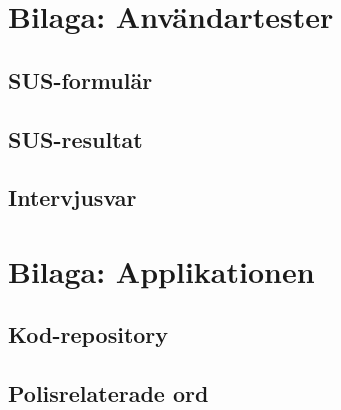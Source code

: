 \documentclass[swedish]{maucsthesis}
\begin{document}
\appendix

\section{Bilaga: Användartester}

\subsection{SUS-formulär}

\subsection{SUS-resultat}

\subsection{Intervjusvar}

\section{Bilaga: Applikationen}

\subsection{Kod-repository}

\subsection{Polisrelaterade ord}
\end{document}
